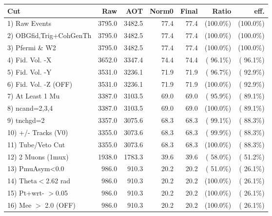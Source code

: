  \begin{table}[h!]\centering
 \begin{tabular}{||l||r|r|r|r|r|r||}
 \hline
 \hline
 Cut & Raw & AOT & Norm0 & Final & Ratio & eff.       \\
 \hline
  1) Raw Events           &       3795.0 &       3482.5 &         77.4 &         77.4 & (100.0\%) & (100.0\%) \\
  2) OBGfid,Trig+CohGenTh &       3795.0 &       3482.5 &         77.4 &         77.4 & (100.0\%) & (100.0\%) \\
  3) Pfermi \& W2         &       3795.0 &       3482.5 &         77.4 &         77.4 & (100.0\%) & (100.0\%) \\
  4) Fid. Vol. -X         &       3652.0 &       3347.4 &         74.4 &         74.4 & ( 96.1\%) & ( 96.1\%) \\
  5) Fid. Vol. -Y         &       3531.0 &       3236.1 &         71.9 &         71.9 & ( 96.7\%) & ( 92.9\%) \\
  6) Fid. Vol. -Z (OFF)   &       3531.0 &       3236.1 &         71.9 &         71.9 & (100.0\%) & ( 92.9\%) \\
  7) At Least 1 Mu        &       3387.0 &       3103.5 &         69.0 &         69.0 & ( 95.9\%) & ( 89.1\%) \\
  8) ncand=2,3,4          &       3387.0 &       3103.5 &         69.0 &         69.0 & (100.0\%) & ( 89.1\%) \\
  9) tnchgd=2             &       3357.0 &       3075.6 &         68.3 &         68.3 & ( 99.1\%) & ( 88.3\%) \\
 10) +/- Tracks (V0)      &       3355.0 &       3073.6 &         68.3 &         68.3 & ( 99.9\%) & ( 88.3\%) \\
 11) Tube/Veto Cut        &       3355.0 &       3073.6 &         68.3 &         68.3 & (100.0\%) & ( 88.3\%) \\
 12) 2 Muons (1mux)       &       1938.0 &       1783.3 &         39.6 &         39.6 & ( 58.0\%) & ( 51.2\%) \\
 13) PmuAsym<0.0          &        986.0 &        910.3 &         20.2 &         20.2 & ( 51.0\%) & ( 26.1\%) \\
 14) Theta$<$2.62 rad     &        986.0 &        910.3 &         20.2 &         20.2 & (100.0\%) & ( 26.1\%) \\
 15) Pt+wrt- $>$0.05      &        986.0 &        910.3 &         20.2 &         20.2 & (100.0\%) & ( 26.1\%) \\
 16) Mee $>$ 2.0  (OFF)   &        986.0 &        910.3 &         20.2 &         20.2 & (100.0\%) & ( 26.1\%) \\

\end{tabular}
\end{table}
